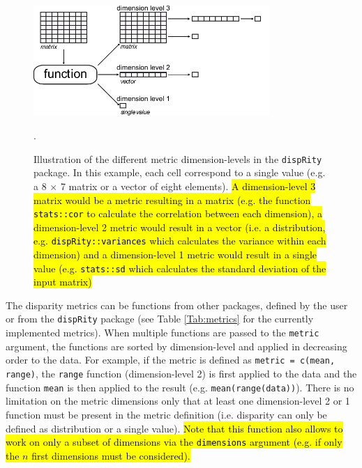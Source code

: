 \documentclass[12pt,letterpaper]{article}
\newcommand{\disp}{\texttt{dispRity} }
\begin{document}
\begin{figure}[!htbp]
\centering
   \includegraphics[width=0.8\textwidth]{../inst/gitbook/dispRity_fun.pdf} 
\caption{Illustration of the different metric dimension-levels in the \disp package. In this example, each cell correspond to a single value (e.g. a 8 $\times$ 7 matrix or a vector of eight elements). \hl{A dimension-level 3 matrix would be a metric resulting in a matrix (e.g. the function \texttt{stats::cor} to calculate the correlation between each dimension), a dimension-level 2 metric would result in a vector (i.e. a distribution, e.g. \texttt{dispRity::variances} which calculates the variance within each dimension) and a dimension-level 1 metric would result in a single value (e.g. \texttt{stats::sd} which calculates the standard deviation of the input matrix)}}.
\label{Fig:levels}
\end{figure}

The disparity metrics can be functions from other packages, defined by the user or from the \disp package (see Table \ref{Tab:metrics} for the currently implemented metrics).
When multiple functions are passed to the \texttt{metric} argument, the functions are sorted by dimension-level and applied in decreasing order to the data.
For example, if the metric is defined as \texttt{metric = c(mean, range)}, the \texttt{range} function (dimension-level 2) is first applied to the data and the function \texttt{mean} is then applied to the result (e.g. \texttt{mean(range(data))}).
There is no limitation on the metric dimensions only that at least one dimension-level 2 or 1 function must be present in the metric definition (i.e. disparity can only be defined as distribution or a single value).
\hl{Note that this function also allows to work on only a subset of dimensions via the \texttt{dimensions} argument (e.g. if only the $n$ first dimensions must be considered).}
\end{document}
